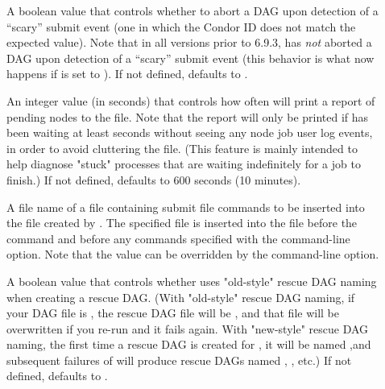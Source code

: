 \begin{description}
\item[]
\label{param:DAGManAbortOnScarySubmit}
A boolean value that controls whether to abort a DAG upon detection of
a ``scary'' submit event (one in which the Condor ID does not match
the expected value).  Note that in all versions prior to 6.9.3,
 has \emph{not} aborted a DAG upon detection of
a ``scary'' submit event (this behavior is what now happens if
 is set to ).
If not defined,  defaults to
.

\item[]
\label{param:DAGManPendingReportInterval}
An integer value (in seconds) that controls how often 
will print a report of pending nodes to the  file.
Note that the report will only be printed if  has
been waiting at least 
seconds without seeing any node job user log events, in order to
avoid cluttering the  file.  (This feature is mainly
intended to help diagnose "stuck"  processes that
are waiting indefinitely for a job to finish.) If not defined,
 defaults to 600 seconds
(10 minutes).

\item[]
\label{param:DAGManInsertSubFile}
A file name of a file containing submit file commands to be inserted
into the  file created by .
The specified file is inserted into the  file before
the  command and before any commands specified with the
  command-line option.
Note that the  value can be overridden
by the   command-line option.

\item[]
\label{param:DAGManOldRescue}
A boolean value that controls whether  uses "old-style"
rescue DAG naming when creating a rescue DAG.  (With "old-style" rescue
DAG naming, if your DAG file is , the rescue DAG file will
be , and that file will be overwritten if you re-run
 and it fails again.  With "new-style" rescue DAG naming,
the first time a rescue DAG is created for , it will be
named ,and subsequent failures of
 will produce rescue DAGs named ,
, etc.)
If not defined,  defaults to
.


\end{description}
